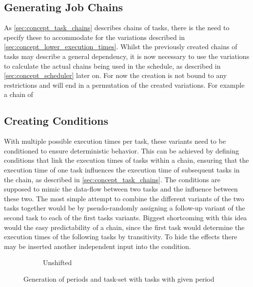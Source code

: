 \subsection{Generating Job Chains}\label{sec:concept_job_chains}
As \cref{sec:concept_task_chains} describes chains of tasks, there is the need to specify these to accommodate for the variations described in \cref{sec:concept_lower_execution_times}.
Whilst the previously created chains of tasks may describe a general dependency, it is now necessary to use the variations to calculate the actual chains being used in the schedule, as described in \cref{sec:concept_scheduler} later on.
For now the creation is not bound to any restrictions and will end in a permutation of the created variations.
For example a chain of 

\subsection{Creating Conditions}\label{sec:creating_conditions}
With multiple possible execution times per task, these variants need to be conditioned to ensure deterministic behavior.
This can be achieved by defining conditions that link the execution times of tasks within a chain, ensuring that the execution time of one task influences the execution time of subsequent tasks in the chain, as described in \cref{sec:concept_task_chains}.
The conditions are supposed to mimic the data-flow between two tasks and the influence between these two.
The most simple attempt to combine the different variants of the two tasks together would be by pseudo-randomly assigning a follow-up variant of the second task to each of the first tasks variants.
Biggest shortcoming with this idea would the easy predictability of a chain, since the first task would determine the execution times of the following tasks by transitivity.
To hide the effects there may be inserted another independent input into the condition.


\begin{figure}[ht]
	\begin{subfigure}[c]{0.45\textwidth}
		\resizebox{\textwidth}{!}{%
			\label{fig:conditions_a}
			
		}
		\caption{Unshifted}
	\end{subfigure}
	\caption{Generation of periods and task-set with tasks with given period}
\end{figure}

